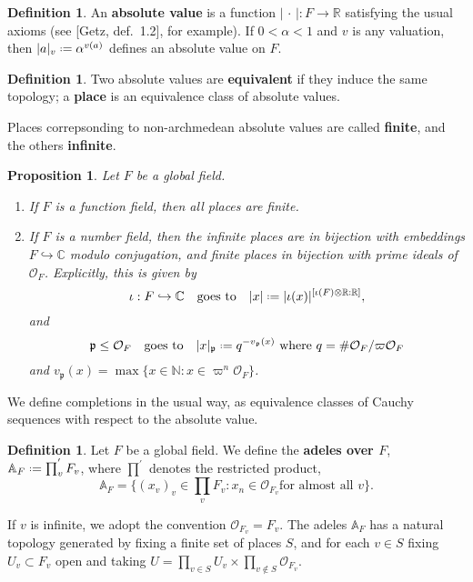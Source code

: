 \documentclass[11pt]{report}
\let\mbb\mathbb
\let\mc\mathcal
\let\mf\mathfrak
\newcommand{\1}{\mathbbm 1}
\newcommand{\N}{\mathbb{N}}
\newcommand{\R}{\mathbb{R}}
\newcommand{\C}{\mathbb{C}}
\newcommand{\A}{\mbb A}
\renewcommand{\O}{\mc O}
\newcommand*{\defeq}{\mathrel{\vcenter{\baselineskip0.5ex \lineskiplimit0pt
      \hbox{\scriptsize.}\hbox{\scriptsize.}}}%
  =}
\theoremstyle{plain}
\newcounter{ex}
\newtheorem{prop}[thm]{Proposition}
\theoremstyle{definition}
\newtheorem{mydef}[thm]{Definition}
\theoremstyle{remark}
\numberwithin{equation}{section}
\begin{document}
\begin{mydef}
  An \textbf{absolute value} is a function $|\,{\cdot} \,| : F \to \R$ satisfying the
  usual axioms (see [Getz, def.~1.2], for example). If $0 < \alpha < 1$ and
  $v$ is any valuation, then $|a|_{v} \defeq \alpha^{v(a)}$ defines an
  absolute value on $F$. 
\end{mydef}

\begin{mydef}
  Two absolute values are \textbf{equivalent} if they induce the same
  topology; a \textbf{place} is an equivalence class of absolute
  values.
\end{mydef}

Places correpsonding to non-archmedean absolute values are called
\textbf{finite}, and the others \textbf{infinite}.

\begin{prop}
  Let $F$ be a global field.
  \begin{enumerate}
  \item If $F$ is a function field, then all places are finite.
    
  \item If $F$ is a number field, then the infinite places are in
    bijection with embeddings $F \hookrightarrow \C$ modulo conjugation, and finite
    places in bijection with prime ideals of $\O_{F}$. Explicitly,
    this is given by
    \begin{equation}
      \label{eq:1}
      \iota : F \hookrightarrow \C \qq{goes to} |x| \defeq |\iota(x)|^{[\iota(F) \otimes \R : \R]},
    \end{equation}
    and
    \begin{equation}
      \label{eq:2}
      \mf p \le \O_{F} \qq{goes to} |x|_{\mf p} \defeq q^{-v_{\mf p}(x)} \text{
        where } q = \# \O_{F}/\varpi \O_{F}
    \end{equation}
    and $v_{\mf p}(x) = \max\{x \in \N : x \in \varpi^{n}\O_{F}\}$. 
  \end{enumerate}
\end{prop}
We define completions in the usual way, as equivalence classes of
Cauchy sequences with respect to the absolute value.

\begin{mydef}
  Let $F$ be a global field. We define the \textbf{adeles over $F$},
  $\A_{F} \defeq \prod_{v}^{'}F_{v}$, where $\prod^{'}$ denotes the restricted
  product,
  \begin{equation}
    \label{eq:3}
    \A_{F} = \{(x_{v})_{v} \in \prod_{v}F_{v} : x_{n} \in \O_{F_{v}} \text{
      for almost all $v$}\}.
  \end{equation}  
\end{mydef}
If $v$ is infinite, we adopt the convention $\O_{F_{v}} = F_{v}$.
The adeles $\A_{F}$ has a natural topology generated by fixing a
finite set of places $S$, and for each $v \in S$ fixing $U_{v}
\subset F_{v}$ open and taking $U = \prod_{v \in S} U_{v} \times \prod_{v \not \in S}
\O_{F_{v}}$. 
\end{document}
